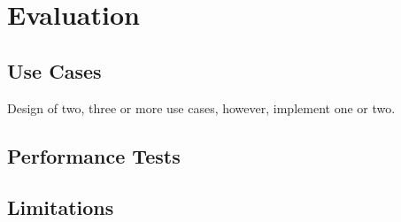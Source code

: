 
\chapter{Evaluation}\label{chapter:evaluation}


\section{Use Cases}
Design of two, three or more use cases, however, implement one or two.
\section{Performance Tests}
\section{Limitations}


